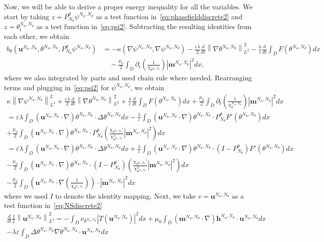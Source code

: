 \documentclass[10pt,letterpaper,twoside]{amsart}
\theoremstyle{definition}{\newtheorem{definition}[lemma]{Definition}}
\theoremstyle{note}{\newtheorem{claim}{Claim}[section]
\newtheorem*{claim*}{Claim}}
\numberwithin{equation}{section}
\newcommand{\dom}{D}
\newcommand{\norm}[1]{\left\| #1 \right\|}
\newcommand{\Grad}{\nabla}
\newcommand{\bmb}{\mathbf{m}^{N_u,N_\theta}}
\newcommand{\bhb}{\mathbf{h}^{N_u,N_\theta}}
\newcommand{\bub}{\mathbf{u}^{N_u,N_\theta}}
\newcommand{\thb}{\theta^{N_u,N_\theta}}
\newcommand{\psib}{\psi^{N_u,N_\theta}}
\begin{document}
Now, we will be able to derive a proper energy inequality for all the variables.  We start by taking $z=P^\theta_{N_\theta}\psi^{N_u,N_\theta}$ as a test function in~\eqref{eq:phasefielddiscrete2} and $z=\thb_t$ as a test function in~\eqref{eq:psi2}. Subtracting the resulting identities from each other, we obtain
\begin{align*}
	b_\theta(\bub,\thb,P^\theta_{N_\theta}\psib) &= -\kappa(\Grad\psib,\Grad\psib)-\frac{\varepsilon\lambda}{2}\frac{d}{dt}\norm{\Grad\thb}_{L^2}^2 -\frac{\lambda}{\varepsilon}\frac{d}{dt}\int_{\dom} F(\thb) dx\\
	&\quad  -\frac{\mu_0}{2}\int_{\dom} \partial_t\left(\frac{1}{\chi_{\thb}}\right) |\bmb|^2 dx,
\end{align*}
where we also integrated by parts and used chain rule where needed. Rearranging terms and plugging in~\eqref{eq:psi2} for $\psib$, we obtain
\begin{multline}\label{eq:thetatemp}
	\kappa\norm{\Grad\psib}_{L^2}^2+\frac{\varepsilon\lambda}{2}\frac{d}{dt}\norm{\Grad\thb}_{L^2}^2 +\frac{\lambda}{\varepsilon}\frac{d}{dt}\int_{\dom} F(\thb) dx +\frac{\mu_0}{2}\int_{\dom} \partial_t\left(\frac{1}{\chi_\thb}\right) |\bmb|^2 dx \\
	=	\varepsilon \lambda\int_{\dom} (\bub\cdot\Grad)\thb \cdot\Delta \thb dx  -\frac{\lambda}{\varepsilon}\int_{\dom} (\bub\cdot\Grad)\thb\cdot P_{N_\theta}^\theta F'(\thb) dx\\
	+\frac{\mu_0}{2}\int_{\dom} (\bub\cdot\Grad)\thb\cdot P_{N_\theta}^\theta \left(\frac{\chi_{\thb}'}{\chi_{\thb}^2}|\bmb|^2 \right)dx \\
	= 	\varepsilon\lambda \int_{\dom} (\bub\cdot\Grad)\thb \cdot\Delta \thb dx  +\frac{\lambda}{\varepsilon}\int_{\dom} (\bub\cdot\Grad)\thb\cdot (I-P_{N_\theta}^\theta) F'(\thb) dx\\
	-\frac{\mu_0}{2}\int_{\dom} (\bub\cdot\Grad)\thb\cdot (I-P_{N_\theta}^\theta) \left(\frac{\chi_{\thb}'}{\chi_{\thb}^2}|\bmb|^2 \right)dx \\
	- \frac{\mu_0}{2}\int_{\dom} \left(\bub\cdot\Grad\left(\frac{1}{\chi_{\thb}}\right) \right)\cdot|\bmb|^2 dx 
\end{multline}
where we used $I$ to denote the identity mapping.
Next, we take $v=\bub$ as a test function in~\eqref{eq:NSdiscrete2}
\begin{multline}\label{eq:utemp}
		\frac{d}{dt}\frac12\norm{\bub}_{L^2}^2
	= -\int_{\dom}\nu_{\thb} |T(\bub)|^2 dx + \mu_0 \int_{\dom} (\bmb\cdot\Grad)\bhb \cdot \bub dx \\
	-\lambda\varepsilon\int_{\dom} \Delta\thb \Grad\thb\cdot\bub dx
\end{multline}
\end{document}
